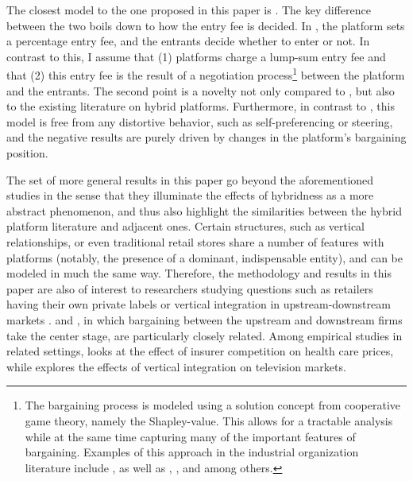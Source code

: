 \documentclass[a4paper]{article}
\begin{document}
The closest model to the one proposed in this paper is \textcite{anderson2021hybrid}.
The key difference between the two boils down to how the entry fee is decided.
In \textcite{anderson2021hybrid}, the platform sets a percentage entry fee, and the entrants decide whether to enter or not.
In contrast to this, I assume that (1) platforms charge a lump-sum entry fee and that (2) this entry fee is the result of a negotiation process\footnote{
    The bargaining process is modeled using a solution concept from cooperative game theory, namely the Shapley-value.
    This allows for a tractable analysis while at the same time capturing many of the important features of bargaining.
    Examples of this approach in the industrial organization literature include \textcite{montez2007downstream}, as well as \textcite{hart1990property}, \textcite{levy1997individual}, \textcite{inderst2003bargaining} and \textcite{brugemann2019intra} among others.
}
between the platform and the entrants.
The second point is a novelty not only compared to \textcite{anderson2021hybrid}, but also to the existing literature on hybrid platforms.
Furthermore, in contrast to \textcite{hagiu2022should}, this model is free from any distortive behavior, such as self-preferencing or steering, and the negative results are purely driven by changes in the platform's bargaining position.

The set of more general results in this paper go beyond the aforementioned studies in the sense that they illuminate the effects of hybridness as a more abstract phenomenon, and thus also highlight the similarities between the hybrid platform literature and adjacent ones.
Certain structures, such as vertical relationships, or even traditional retail stores share a number of features with platforms (notably, the presence of a dominant, indispensable entity), and can be modeled in much the same way.
Therefore, the methodology and results in this paper are also of interest to researchers studying questions such as retailers having their own private labels \parencite{steiner2004nature} or vertical integration in upstream-downstream markets \parencite{hart1990vertical,aghion2006vertical}.
\textcite{de2005vertical} and \textcite{montez2007downstream}, in which bargaining between the upstream and downstream firms take the center stage, are particularly closely related.
Among empirical studies in related settings, \textcite{ho2017insurer} looks at the effect of insurer competition on health care prices, while \textcite{crawford2018welfare} explores the effects of vertical integration on television markets.
\end{document}
